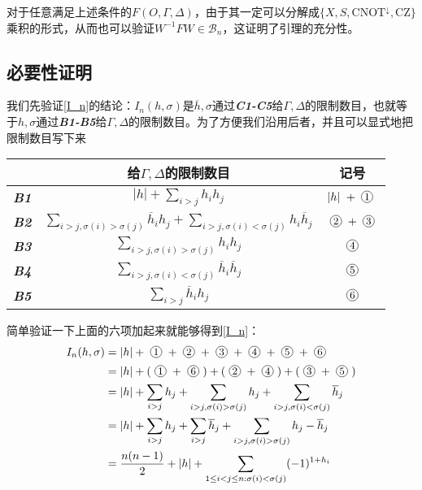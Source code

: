 \documentclass[8pt]{article}
\newcommand*{\circled}[1]{\lower.7ex\hbox{\tikz\draw (0pt, 0pt)%
		circle (.5em) node {\makebox[1em][c]{\small #1}};}}
\begin{document}
\begin{appendices}
对于任意满足上述条件的$F(O, \Gamma, \Delta)$，由于其一定可以分解成$\{X, S, \text{CNOT}^{\downarrow}, \text{CZ}\}$乘积的形式，从而也可以验证$W^{-1}FW \in \mathcal B_n$，这证明了引理的充分性。

\subsection{必要性证明}

我们先验证\cref{I_n}的结论：$I_n(h, \sigma)$是$\overline h, \sigma$通过\textbf{\textit{C1-C5}}给$\Gamma, \Delta$的限制数目，也就等于$h, \sigma$通过\textbf{\textit{B1-B5}}给$\Gamma, \Delta$的限制数目。为了方便我们沿用后者，并且可以显式地把限制数目写下来
\begin{center}
\begin{tabular}{c|c|c}
	& 给$\Gamma, \Delta$的限制数目 & 记号\\
	\hline
	\textbf{\textit{B1}} & $|h| + \sum_{i > j}h_ih_j$ & $|h|\ + \circled{1}$\\
	\textbf{\textit{B2}} & $\sum_{i > j, \sigma(i) > \sigma(j)}\overline{h}_ih_j + \sum_{i > j, \sigma(i) < \sigma(j)}h_i\overline h_j$ & $\circled{2} + \circled{3}$\\
	\textbf{\textit{B3}} & $\sum_{i > j, \sigma(i) > \sigma(j)}h_ih_j$ & $\circled{4}$\\
	\textbf{\textit{B4}} & $\sum_{i > j, \sigma(i) < \sigma(j)}\overline h_i\overline h_j$ & $\circled{5}$\\
	\textbf{\textit{B5}} & $\sum_{i > j}\overline h_ih_j$ & $\circled{6}$\\
\end{tabular}
\end{center}

简单验证一下上面的六项加起来就能够得到\cref{I_n}：
\begin{equation}
\begin{split}
I_n(h, \sigma) &= |h| + \circled 1 + \circled 2 + \circled 3 + \circled 4 + \circled 5 + \circled 6\\
&= |h| + (\circled 1 + \circled 6) + (\circled 2 + \circled 4) + (\circled 3 + \circled 5)\\
&= |h| + \sum_{i > j}h_j + \sum_{i > j, \sigma(i) > \sigma(j)}h_j + \sum_{i > j, \sigma(i) < \sigma(j)}\overline h_j\\
&= |h| + \sum_{i > j}h_j + \sum_{i > j}\overline h_j + \sum_{i > j, \sigma(i) > \sigma(j)}h_j - \overline{h}_j\\
&= \frac{n(n-1)}{2} + |h| + \sum_{1 \le i < j \le n: \sigma(i) < \sigma(j)}(-1)^{1 + h_i}
\end{split}
\end{equation}


\end{appendices}
\end{document}

